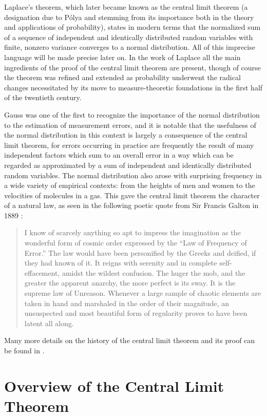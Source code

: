 \documentclass{svjour3}
\begin{document}
Laplace's theorem, which later became known as the central limit theorem (a designation due to P\'olya and stemming from its importance both in the theory and applications of probability), states in modern terms that the normalized sum of a sequence of independent and identically distributed random variables with finite, nonzero variance converges to a normal distribution. All of this imprecise language will be made precise later on. In the work of Laplace all the main ingredients of the proof of the central limit theorem are present, though of course the theorem was refined and extended as probability underwent the radical changes necessitated by its move to measure-theoretic foundations in the first half of the twentieth century.

Gauss was one of the first to recognize the importance of the normal distribution to the estimation of measurement errors, and it is notable that the usefulness of the normal distribution in this context is largely a consequence of the central limit theorem, for errors occurring in practice are frequently the result of many independent factors which sum to an overall error in a way which can be regarded as approximated by a sum of independent and identically distributed random variables. The normal distribution also arose with surprising frequency in a wide variety of empirical contexts: from the heights of men and women to the velocities of molecules in a gas. This gave the central limit theorem the character of a natural law, as seen in the following poetic quote from Sir Francis Galton in 1889 \cite{galton}:
\begin{quote}
 I know of scarcely anything so apt to impress the imagination as the wonderful form of cosmic order expressed by the ``Law of Frequency of Error.'' The law would have been personified by the Greeks and deified, if they had known of it. It reigns with serenity and in complete self-effacement, amidst the wildest confusion. The huger the mob, and the greater the apparent anarchy, the more perfect is its sway. It is the supreme law of Unreason. Whenever a large sample of chaotic elements are taken in hand and marshaled in the order of their magnitude, an unsuspected and most beautiful form of regularity proves to have been latent all along.
\end{quote}
Many more details on the history of the central limit theorem and its proof can be found in \cite{fischer}.


\section{Overview of the Central Limit Theorem}
\label{section:overview}
\end{document}
